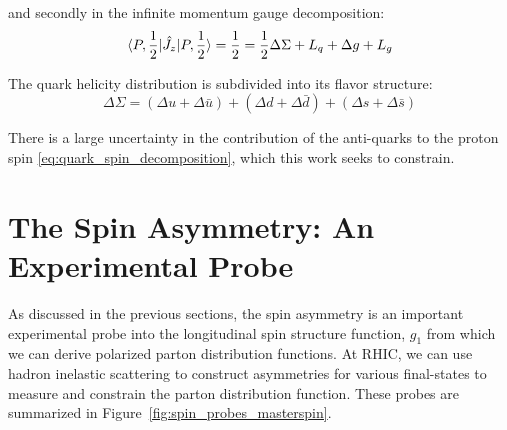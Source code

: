 {\noindent}and secondly in the infinite momentum gauge decomposition:
\begin{equation}
  \braket{P,{1\over2}|\hat{J_z}|P,{1\over2}}  
  = {1\over2} = {{1\over2}\Delta \Sigma +L_q+\Delta g + L_g}
  \label{eq:infmom_ellis_jeffe_sum}
\end{equation}

{\noindent}The quark helicity distribution is subdivided into its flavor
structure:
\begin{equation}
  {\Delta \Sigma} =
  {
    (\Delta u+\Delta \bar{u})
    +(\Delta d + \Delta \bar{d})
    +(\Delta s + \Delta \bar{s})
  }
  \label{eq:quark_spin_decomposition}
\end{equation}

{\noindent}There is a large uncertainty in the contribution of the anti-quarks
to the proton spin \ref{eq:quark_spin_decomposition}, which this work seeks to
constrain.

\section{The Spin Asymmetry: An Experimental Probe }

As discussed in the previous sections, the spin asymmetry is an important
experimental probe into the longitudinal spin structure function, $g_1$ from
which we can derive polarized parton distribution functions. At RHIC, we can use
hadron inelastic scattering to construct asymmetries for various final-states to
measure and constrain the parton distribution function. These probes are
summarized in Figure~\ref{fig:spin_probes_masterspin}.

